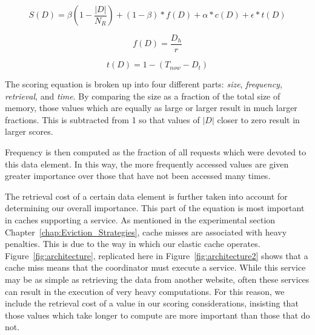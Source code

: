 \begin{equation}
	S(D) = \beta \left(1 - \frac{|D|}{N_R}\right) + (1 - \beta) * f(D) +
	\alpha*c(D) + \epsilon * t(D)
\label{eqn:scoring}
\end{equation}

\begin{equation}
	f(D) = \frac{D_h}{r}
\label{eqn:frequency}
\end{equation}

\begin{equation}
	t(D) = 1 - (T_{now} - D_t)
\label{eqn:time}
\end{equation}

The scoring equation is broken up into four different parts: \emph{size},
\emph{frequency}, \emph{retrieval}, and \emph{time}. By comparing the size as a
fraction of the total size of memory, those values which are equally as large
or larger result in much larger fractions. This is subtracted from 1 so that
values of $|D|$ closer to zero result in larger scores.

Frequency is then computed as the fraction of all requests which were devoted
to this data element. In this way, the more frequently accessed values are
given greater importance over those that have not been accessed many times.

The retrieval cost of a certain data element is further taken into account for
determining our overall importance. This part of the equation is most important in
caches supporting a service. As mentioned in the experimental section
Chapter~\ref{chap:Eviction_Strategies}, cache misses are associated with heavy
penalties. This is due to the way in which our elastic cache operates.
Figure~\ref{fig:architecture}, replicated here in
Figure~\ref{fig:architecture2} shows that a cache miss means that the
coordinator must execute a service. While this service may be as simple as
retrieving the data from another website, often these services can result in
the execution of very heavy computations. For this reason, we include the
retrieval cost of a value in our scoring considerations, insisting that those
values which take longer to compute are more important than those that do not.

